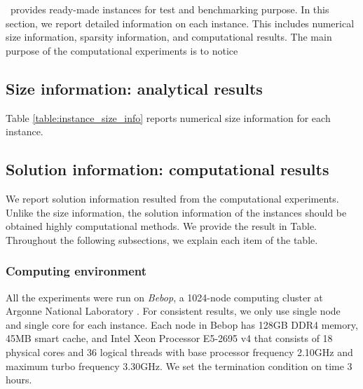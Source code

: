 %
%

  \siplibtwo\ provides ready-made instances for test and benchmarking  purpose. In this section, we report detailed information on each instance. This includes numerical size information, sparsity information, and computational results. The main purpose of the computational experiments is to notice 

\subsection{Size information: analytical results}
Table \ref{table:instance_size_info} reports numerical size information for each instance.


\subsection{Solution information: computational results}
We report solution information resulted from the computational experiments. Unlike the size information, the solution information of the instances should be obtained highly computational methods. We provide the result in Table. Throughout the following subsections, we explain each item of the table.

\subsubsection{Computing environment}
All the experiments were run on \textit{Bebop}, a 1024-node computing cluster at Argonne National Laboratory \cite{bebop}. For consistent results, we only use single node and single core for each instance. Each node in Bebop has 128GB DDR4 memory, 45MB smart cache, and Intel Xeon Processor E5-2695 v4 that consists of 18 physical cores and 36 logical threads with base processor frequency 2.10GHz and maximum turbo frequency 3.30GHz. We set the termination condition on time 3 hours. 


